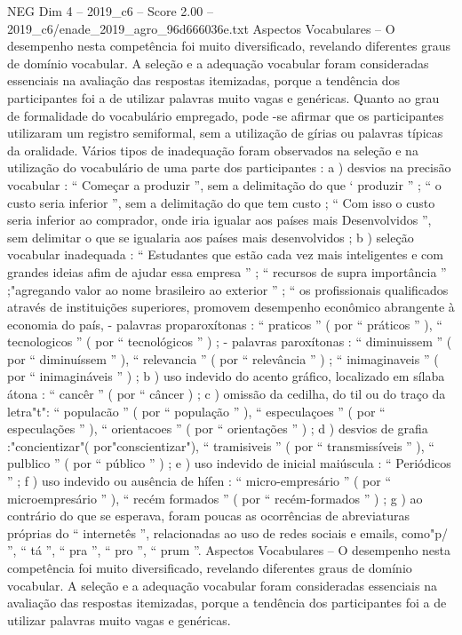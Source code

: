 \begin{textsample}{NEG Dim 4 – 2019\_c6 – Score 2.00 – 2019\_c6/enade\_2019\_agro\_96d666036e.txt}
Aspectos Vocabulares – O desempenho nesta competência foi muito diversificado, revelando diferentes graus de domínio vocabular.
A seleção e a adequação vocabular foram consideradas essenciais na avaliação das respostas itemizadas, porque a tendência dos participantes foi a de utilizar palavras muito vagas e genéricas.
Quanto ao grau de formalidade do vocabulário empregado, pode -se afirmar que os participantes utilizaram um registro semiformal, sem a utilização de gírias ou palavras típicas da oralidade.
Vários tipos de inadequação foram observados na seleção e na utilização do vocabulário de uma parte dos participantes : a ) desvios na precisão vocabular : “ Começar a produzir ”, sem a delimitação do que ‘ produzir ” ; “ o custo seria inferior ”, sem a delimitação do que tem custo ; “ Com isso o custo seria inferior ao comprador, onde iria igualar aos países mais Desenvolvidos ”, sem delimitar o que se igualaria aos países mais desenvolvidos ; b ) seleção vocabular inadequada : “ Estudantes que estão cada vez mais inteligentes e com grandes ideias afim de ajudar essa empresa ” ; “ recursos de supra importância ” ;"agregando valor ao nome brasileiro ao exterior ” ; “ os profissionais qualificados através de instituições superiores, promovem desempenho econômico abrangente à economia do país, - palavras proparoxítonas : “ praticos ” ( por “ práticos ” ), “ tecnologicos ” ( por “ tecnológicos ” ) ; - palavras paroxítonas : “ diminuissem ” ( por “ diminuíssem ” ), “ relevancia ” ( por “ relevância ” ) ; “ inimaginaveis ” ( por “ inimagináveis ” ) ; b ) uso indevido do acento gráfico, localizado em sílaba átona : “ cancêr ” ( por “ câncer ) ; c ) omissão da cedilha, do til ou do traço da letra"t": “ populacão ” ( por “ população ” ), “ especulaçoes ” ( por “ especulações ” ), “ orientacoes ” ( por “ orientações ” ) ; d ) desvios de grafia :"concientizar"( por"conscientizar"), “ tramisiveis ” ( por “ transmissíveis ” ), “ pulblico ” ( por “ público ” ) ; e ) uso indevido de inicial maiúscula : “ Periódicos ” ; f ) uso indevido ou ausência de hífen : “ micro-empresário ” ( por “ microempresário ” ), “ recém formados ” ( por “ recém-formados ” ) ; g ) ao contrário do que se esperava, foram poucas as ocorrências de abreviaturas próprias do “ internetês ”, relacionadas ao uso de redes sociais e emails, como"p/ ”, “ tá ”, “ pra ”, “ pro ”, “ prum ”.
Aspectos Vocabulares – O desempenho nesta competência foi muito diversificado, revelando diferentes graus de domínio vocabular.
A seleção e a adequação vocabular foram consideradas essenciais na avaliação das respostas itemizadas, porque a tendência dos participantes foi a de utilizar palavras muito vagas e genéricas.

\end{textsample}
